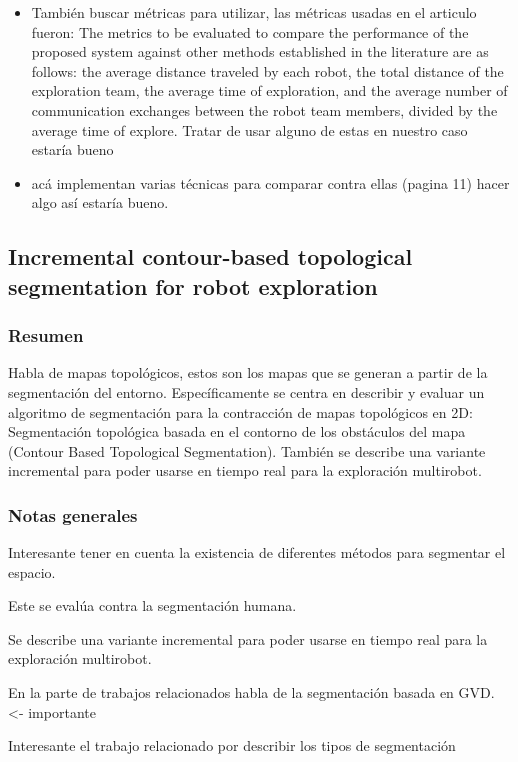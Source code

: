 \begin{itemize}
\item También buscar métricas para utilizar, las métricas usadas en el articulo fueron: The metrics to be evaluated to compare the performance of the proposed system against other methods established in the literature are as follows: the average distance traveled by each robot, the total distance of the exploration team, the average time of exploration, and the average number of communication exchanges between the robot team members, divided by the average time of explore. Tratar de usar alguno de estas en nuestro caso estaría bueno

\item acá implementan varias técnicas para comparar contra ellas (pagina 11) hacer algo así estaría bueno.
\end{itemize}

\subsection{Incremental contour-based topological segmentation for robot exploration}

\subsubsection{Resumen}
Habla de mapas topológicos, estos son los mapas que se generan a partir de la segmentación del entorno. 
Específicamente se centra en describir y evaluar un algoritmo de segmentación para la contracción de mapas topológicos en 2D: Segmentación topológica basada en el contorno de los obstáculos del mapa (Contour Based Topological Segmentation).
También se describe una variante incremental para poder usarse en tiempo real para la exploración multirobot.

\subsubsection{Notas generales}
Interesante tener en cuenta la existencia de diferentes métodos para segmentar el espacio.

Este se evalúa contra la segmentación humana.

Se describe una variante incremental para poder usarse en tiempo real para la exploración multirobot.

En la parte de trabajos relacionados habla de la segmentación basada en GVD. <- importante

Interesante el trabajo relacionado por describir los tipos de segmentación

